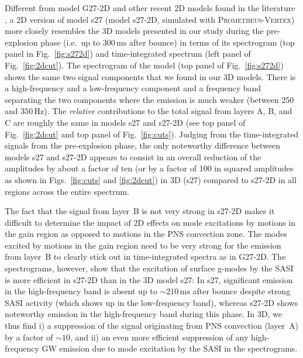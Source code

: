 Different from model G27-2D and other recent 2D models found in
the literature \citep{marek_08,murphy_09,mueller_13}, a 2D version of
model s27 (model s27-2D, simulated with \textsc{Prometheus-Vertex})
more closely resembles the 3D models presented in our study during
the pre-explosion phase (i.e.\ up to $300\, \mathrm{ms}$ after
bounce) in terms of its spectrogram (top panel in
Fig.~\ref{fig:s272d}) and time-integrated spectrum (left panel of
Fig.~\ref{fig:2dcut}).  The spectrogram of the model (top
panel of Fig.~\ref{fig:s272d}) shows the same two signal components
that we found in our 3D models. There is a high-frequency and a
low-frequency component and a frequency band separating the two
components where the emission is much weaker (between 250 and $350\,
\mathrm{Hz}$).  The \emph{relative} contributions to the total
signal from layers A, B, and C are roughly the same in models s27 and
s27-2D (see top panel of Fig.~\ref{fig:2dcut} and top panel of
Fig.~\ref{fig:cuts}).  Judging from the time-integrated signals from
the pre-explosion phase, the only noteworthy difference between
models s27 and s27-2D appears to consist in an overall reduction of
the amplitudes by about a factor of ten (or by a factor of 100 in
squared amplitudes as shown in Figs.~\ref{fig:cuts} and
\ref{fig:2dcut}) in 3D (s27) compared to s27-2D in all regions
across the entire spectrum. 

The fact that the signal from layer~B is not very strong
in s27-2D makes it difficult to determine the impact of 2D effects
on mode excitations by motions in the gain
region as opposed to motions in the PNS convection zone. The
modes excited by motions in the gain region need to be very strong for
the emission from layer~B to clearly stick out in time-integrated
spectra as in G27-2D. The spectrograms, however, show that
the excitation of surface g-modes by the SASI is more efficient
in s27-2D than in the 3D model s27: In s27, significant emission in
the high-frequency band is absent up to $\mathord{\sim} 210\, \mathrm{ms}$
after bounce despite strong SASI activity (which shows up
in the low-frequency band), whereas s27-2D shows noteworthy
emission in the high-frequency band during this phase.
In 3D, we thus find i) a suppression of the signal originating
from PNS convection (layer~A) by a factor of $\mathord{\sim 10}$,
and ii) an even more efficient suppression of
any high-frequency GW emission due to mode excitation
by the SASI in the spectrograms. 


